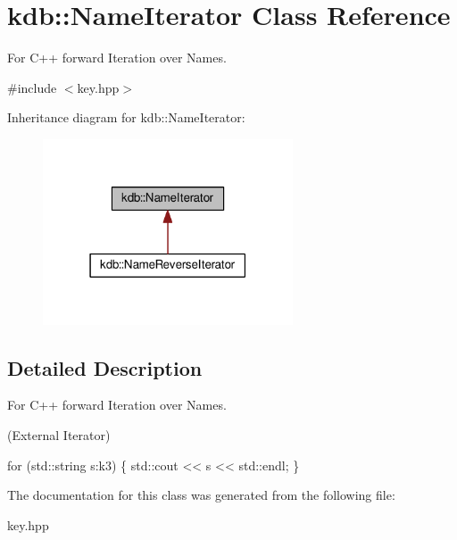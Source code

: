 \hypertarget{classkdb_1_1NameIterator}{\section{kdb\+:\+:Name\+Iterator Class Reference}
\label{classkdb_1_1NameIterator}
}


For C++ forward Iteration over Names.  




{\ttfamily \#include $<$key.\+hpp$>$}



Inheritance diagram for kdb\+:\+:Name\+Iterator\+:
\nopagebreak
\begin{figure}[H]
\begin{center}
\leavevmode
\includegraphics[width=210pt]{classkdb_1_1NameIterator__inherit__graph}
\end{center}
\end{figure}


\subsection{Detailed Description}
For C++ forward Iteration over Names. 

(External Iterator) 
\begin{DoxyCode}
\textcolor{keywordflow}{for} (std::string s:k3)
\{
   std::cout << s << std::endl;
\}
\end{DoxyCode}
 

The documentation for this class was generated from the following file\+:\begin{DoxyCompactItemize}
\item 
key.\+hpp\end{DoxyCompactItemize}
